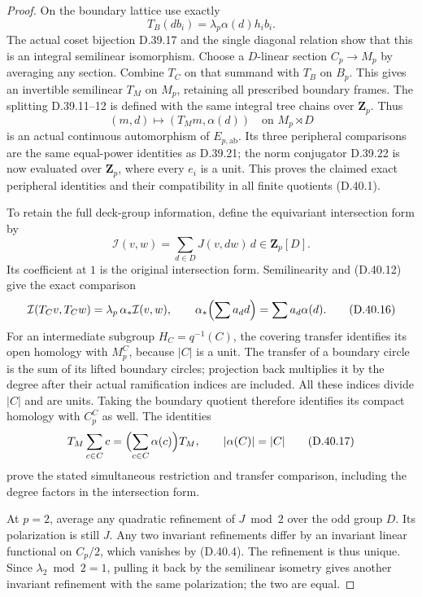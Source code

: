 \begin{proof}
On the boundary lattice use exactly
\[
                 T_B(d b_i)=\lambda_p\alpha(d)h_i b_i.
 \tag{D.40.13}
\]
The actual coset bijection D.39.17 and the
single diagonal relation show that this is
an integral semilinear isomorphism.
Choose a \(D\)-linear section \(C_p\to M_p\)
by averaging any section.
Combine \(T_C\) on that summand with
\(T_B\) on \(B_p\).  This gives an invertible
semilinear \(T_M\) on \(M_p\), retaining all
prescribed boundary frames.
The splitting D.39.11--12 is defined with
the same integral tree chains over
\(\mathbf Z_p\).
Thus
\[
          (m,d)\longmapsto(T_Mm,\alpha(d))
                   \quad\text{on }M_p\rtimes D
 \tag{D.40.14}
\]
is an actual continuous automorphism of
\(E_{p,\mathrm{ab}}\).
Its three peripheral comparisons are the
same equal-power identities as D.39.21;
the norm conjugator D.39.22 is now evaluated
over \(\mathbf Z_p\), where every \(e_i\)
is a unit.  This proves the claimed exact
peripheral identities and their compatibility
in all finite quotients \textup{(D.40.1)}.

To retain the full deck-group information,
define the equivariant intersection form by
\[
 {\mathcal I}(v,w)=
       \sum_{d\in D}J(v,dw)\,d\in\mathbf Z_p[D].
 \tag{D.40.15}
\]
Its coefficient at \(1\) is the original
intersection form.  Semilinearity and
\textup{(D.40.12)} give the exact comparison
\[
 {\mathcal I}(T_Cv,T_Cw)
        =\lambda_p\,\alpha_*{\mathcal I}(v,w),
 \qquad
 \alpha_*\Bigl(\sum a_d d\Bigr)=\sum a_d\alpha(d).
 \tag{D.40.16}
\]
For an intermediate subgroup \(H_C=q^{-1}(C)\),
the covering transfer identifies its open
homology with \(M_p^C\), because \(|C|\)
is a unit.  The transfer of a boundary
circle is the sum of its lifted boundary
circles; projection back multiplies it
by the degree after their actual ramification
indices are included.
All these indices divide \(|C|\) and are units.
Taking the boundary quotient therefore identifies
its compact homology with \(C_p^C\) as well.
The identities
\[
 T_M\sum_{c\in C}c
       =\Bigl(\sum_{c\in C}\alpha(c)\Bigr)T_M,
 \qquad |\alpha(C)|=|C|
 \tag{D.40.17}
\]
prove the stated simultaneous restriction
and transfer comparison, including the
degree factors in the intersection form.

At \(p=2\), average any quadratic refinement
of \(J\bmod2\) over the odd group \(D\).
Its polarization is still \(J\).
Any two invariant refinements differ by
an invariant linear functional on \(C_p/2\),
which vanishes by \textup{(D.40.4)}.
The refinement is thus unique.
Since \(\lambda_2\bmod2=1\), pulling it back
by the semilinear isometry gives another
invariant refinement with the same polarization;
the two are equal.
\end{proof}

